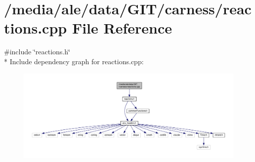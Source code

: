 \hypertarget{a00084}{\section{/media/ale/data/\-G\-I\-T/carness/reactions.cpp File Reference}
\label{a00084}
}
{\ttfamily \#include \char`\"{}reactions.\-h\char`\"{}}\\*
Include dependency graph for reactions.\-cpp\-:\nopagebreak
\begin{figure}[H]
\begin{center}
\leavevmode
\includegraphics[width=350pt]{a00157}
\end{center}
\end{figure}
